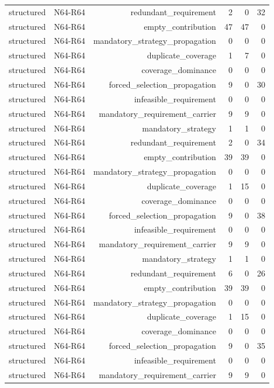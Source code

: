{\begin{longtable}{lrrrrr}
structured & N64-R64 & redundant\_requirement & 2 & 0 & 32 \\
structured & N64-R64 & empty\_contribution & 47 & 47 & 0 \\
structured & N64-R64 & mandatory\_strategy\_propagation & 0 & 0 & 0 \\
structured & N64-R64 & duplicate\_coverage & 1 & 7 & 0 \\
structured & N64-R64 & coverage\_dominance & 0 & 0 & 0 \\
structured & N64-R64 & forced\_selection\_propagation & 9 & 0 & 30 \\
structured & N64-R64 & infeasible\_requirement & 0 & 0 & 0 \\
structured & N64-R64 & mandatory\_requirement\_carrier & 9 & 9 & 0 \\
structured & N64-R64 & mandatory\_strategy & 1 & 1 & 0 \\
structured & N64-R64 & redundant\_requirement & 2 & 0 & 34 \\
structured & N64-R64 & empty\_contribution & 39 & 39 & 0 \\
structured & N64-R64 & mandatory\_strategy\_propagation & 0 & 0 & 0 \\
structured & N64-R64 & duplicate\_coverage & 1 & 15 & 0 \\
structured & N64-R64 & coverage\_dominance & 0 & 0 & 0 \\
structured & N64-R64 & forced\_selection\_propagation & 9 & 0 & 38 \\
structured & N64-R64 & infeasible\_requirement & 0 & 0 & 0 \\
structured & N64-R64 & mandatory\_requirement\_carrier & 9 & 9 & 0 \\
structured & N64-R64 & mandatory\_strategy & 1 & 1 & 0 \\
structured & N64-R64 & redundant\_requirement & 6 & 0 & 26 \\
structured & N64-R64 & empty\_contribution & 39 & 39 & 0 \\
structured & N64-R64 & mandatory\_strategy\_propagation & 0 & 0 & 0 \\
structured & N64-R64 & duplicate\_coverage & 1 & 15 & 0 \\
structured & N64-R64 & coverage\_dominance & 0 & 0 & 0 \\
structured & N64-R64 & forced\_selection\_propagation & 9 & 0 & 35 \\
structured & N64-R64 & infeasible\_requirement & 0 & 0 & 0 \\
structured & N64-R64 & mandatory\_requirement\_carrier & 9 & 9 & 0 \\

\end{longtable}}
